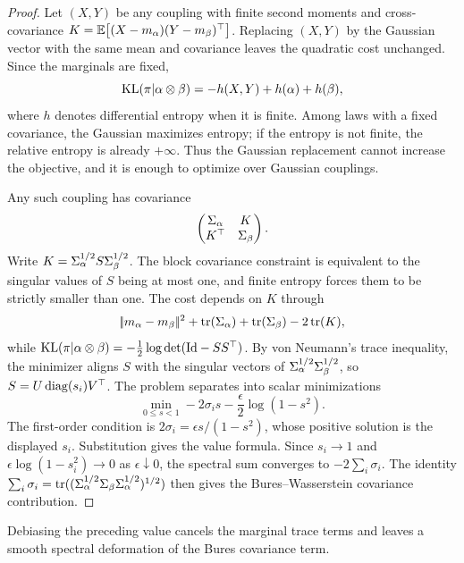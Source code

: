 \begin{proof}
	Let $(X,Y)$ be any coupling with finite second moments and cross-covariance
	\(K=\mathbb{E}\big[(X-m_\alpha)(Y-m_\beta)^\top\big]\).
	Replacing $(X,Y)$ by the Gaussian vector with the same mean and covariance leaves the quadratic cost unchanged. Since the marginals are fixed,
	\[
		\operatorname{KL}(\pi|\alpha\otimes\beta)
		=
		-h(X,Y)+h(\alpha)+h(\beta),
	\]
	where $h$ denotes differential entropy when it is finite. Among laws with a fixed covariance, the Gaussian maximizes entropy; if the entropy is not finite, the relative entropy is already $+\infty$. Thus the Gaussian replacement cannot increase the objective, and it is enough to optimize over Gaussian couplings.

	Any such coupling has covariance
	\[
		\begin{pmatrix}
			\Sigma_\alpha & K\\
			K^\top & \Sigma_\beta
		\end{pmatrix}.
	\]
	Write $K=\Sigma_\alpha^{1/2}S\Sigma_\beta^{1/2}$. The block covariance constraint is equivalent to the singular values of $S$ being at most one, and finite entropy forces them to be strictly smaller than one. The cost depends on $K$ through
	\[
		|\!| m_\alpha-m_\beta |\!|^2+\operatorname{tr}(\Sigma_\alpha)+\operatorname{tr}(\Sigma_\beta)-2\operatorname{tr}(K),
	\]
	while $\operatorname{KL}(\pi|\alpha\otimes\beta)=-\frac12\log\det(\mathrm{Id}-SS^\top)$.
	By von Neumann's trace inequality, the minimizer aligns $S$ with the singular vectors of $\Sigma_\alpha^{1/2}\Sigma_\beta^{1/2}$, so $S=U\operatorname{diag}(s_i)V^\top$. The problem separates into scalar minimizations
	\[
		\min_{0\leq s<1}
		-2\sigma_i s-\frac{\epsilon}{2}\log(1-s^2).
	\]
	The first-order condition is $2\sigma_i=\epsilon s/(1-s^2)$, whose positive solution is the displayed $s_i$. Substitution gives the value formula. Since $s_i\to1$ and $\epsilon\log(1-s_i^2)\to0$ as $\epsilon\downarrow0$, the spectral sum converges to $-2\sum_i\sigma_i$. The identity $\sum_i\sigma_i=\operatorname{tr}((\Sigma_\alpha^{1/2}\Sigma_\beta\Sigma_\alpha^{1/2})^{1/2})$ then gives the Bures--Wasserstein covariance contribution.
\end{proof}

Debiasing the preceding value cancels the marginal trace terms and leaves a smooth spectral deformation of the Bures covariance term.


